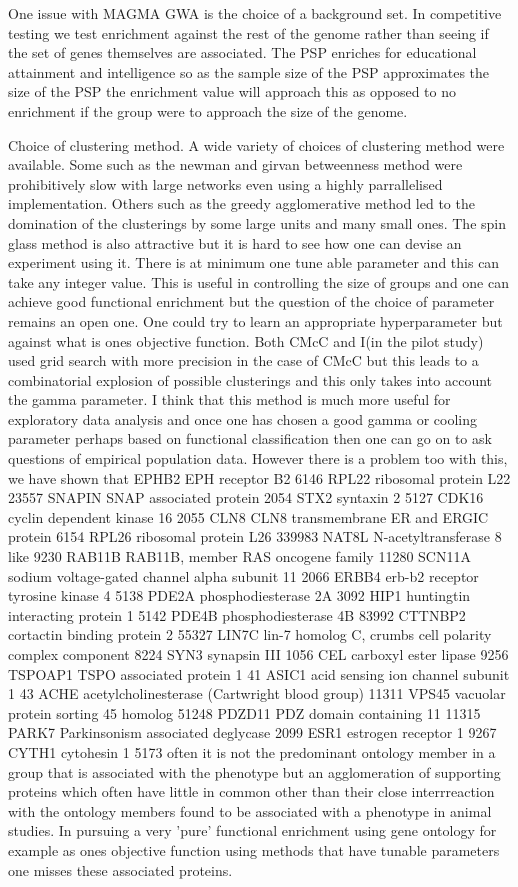 One issue with MAGMA GWA is the choice of a background set. In competitive testing we test enrichment against the rest of the genome rather than seeing if the set of genes themselves are associated. The PSP enriches for educational attainment and intelligence so as the sample size of the PSP approximates the size of the PSP the enrichment value will approach this as opposed to no enrichment if the group were to approach the size of the genome. 


Choice of clustering method. A wide variety of choices of clustering method were available. Some such as the newman and girvan betweenness method were prohibitively slow with large networks even using a highly parrallelised implementation. Others such as the greedy agglomerative method led to the domination of the clusterings by some large units and many small ones. The spin glass method is also attractive but it is hard to see how one can devise an experiment using it. There is at minimum one tune able parameter and this can take any integer value. This is useful in controlling the size of groups and one can achieve good functional enrichment but the question of the choice of parameter remains an open one. One could try to learn an appropriate hyperparameter but against what is ones objective function. Both CMcC and I(in the pilot study) used grid search with more precision in the case of CMcC but this leads to a combinatorial explosion of possible clusterings and this only takes into account the gamma parameter. I think that this method is much more useful for exploratory data analysis and once one has chosen a good gamma or cooling parameter perhaps based on functional classification then one can go on to ask questions of empirical population data. However there is a problem too with this, we have shown that	EPHB2	EPH receptor B2
6146	RPL22	ribosomal protein L22
23557	SNAPIN	SNAP associated protein
2054	STX2	syntaxin 2
5127	CDK16	cyclin dependent kinase 16
2055	CLN8	CLN8 transmembrane ER and ERGIC protein
6154	RPL26	ribosomal protein L26
339983	NAT8L	N-acetyltransferase 8 like
9230	RAB11B	RAB11B, member RAS oncogene family
11280	SCN11A	sodium voltage-gated channel alpha subunit 11
2066	ERBB4	erb-b2 receptor tyrosine kinase 4
5138	PDE2A	phosphodiesterase 2A
3092	HIP1	huntingtin interacting protein 1
5142	PDE4B	phosphodiesterase 4B
83992	CTTNBP2	cortactin binding protein 2
55327	LIN7C	lin-7 homolog C, crumbs cell polarity complex component
8224	SYN3	synapsin III
1056	CEL	carboxyl ester lipase
9256	TSPOAP1	TSPO associated protein 1
41	ASIC1	acid sensing ion channel subunit 1
43	ACHE	acetylcholinesterase (Cartwright blood group)
11311	VPS45	vacuolar protein sorting 45 homolog
51248	PDZD11	PDZ domain containing 11
11315	PARK7	Parkinsonism associated deglycase
2099	ESR1	estrogen receptor 1
9267	CYTH1	cytohesin 1
5173 often it is not the predominant ontology member in a group that is associated with the phenotype but an agglomeration of supporting proteins which often have little in common other than their close interrreaction with the ontology members found to be associated with a phenotype in animal studies. In pursuing a very 'pure' functional enrichment using gene ontology for example as ones objective function using methods that have tunable parameters one misses these associated proteins. 

